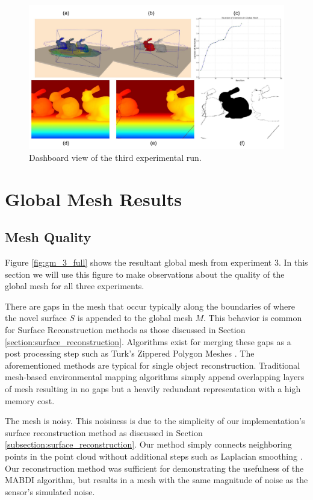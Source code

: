 \begin{figure}[h]%
\centering
  \includegraphics[width=\textwidth]{figures/diagram_run3.pdf}
  \caption{Dashboard view of the third experimental run.}
  \label{fig:run3}
\end{figure}

\section{Global Mesh Results}
\label{section:results2}

\subsection{Mesh Quality}

Figure \ref{fig:gm_3_full} shows the resultant global mesh from experiment 3. In
this section we will use this figure to make observations about the quality of
the global mesh for all three experiments.

There are gaps in the mesh that occur typically along the boundaries
of where the novel surface $S$ is appended to the global mesh $M$. This behavior
is common for Surface Reconstruction methods as those discussed in Section
\ref{section:surface_reconstruction}. Algorithms exist for merging these gaps as
a post processing step such as Turk's Zippered Polygon Meshes \cite{Turk1994}.
The aforementioned methods are typical for single object reconstruction.
Traditional mesh-based environmental mapping algorithms simply append
overlapping layers of mesh resulting in no gaps but a heavily redundant
representation with a high memory cost.

The mesh is noisy. This noisiness is due to the simplicity of our
implementation's surface reconstruction method as discussed in Section
\ref{subsection:surface_reconstruction}. Our method simply connects neighboring
points in the point cloud without additional steps such as Laplacian smoothing
\cite{Nealen2006}. Our reconstruction method was sufficient for
demonstrating the usefulness of the MABDI algorithm, but results in a mesh with
the same magnitude of noise as the sensor's simulated noise.

